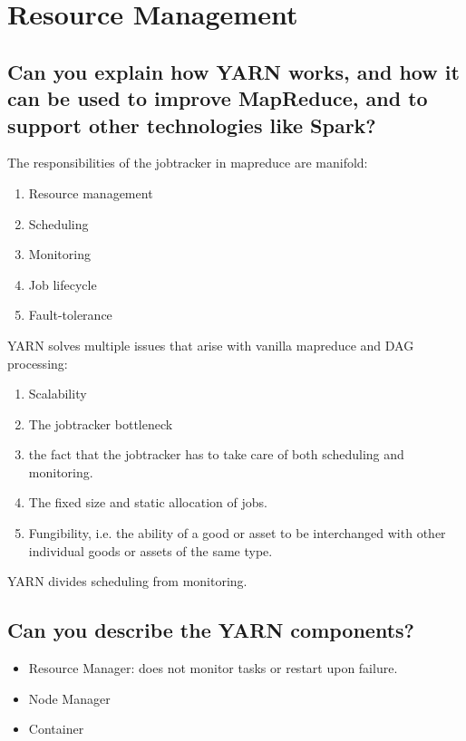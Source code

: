 \documentclass{article}
\begin{document}
\pagebreak

\section{Resource Management}



\subsection{Can you explain how YARN works, and how it can be used to improve MapReduce, and to support other technologies like Spark?}

The responsibilities of the jobtracker in mapreduce are manifold:

\begin{enumerate}
\item Resource management
\item Scheduling
\item Monitoring
\item Job lifecycle
\item Fault-tolerance
\end{enumerate}


YARN solves multiple issues that arise with vanilla mapreduce and DAG processing:
\begin{enumerate}
\item Scalability
\item The jobtracker bottleneck
\item the fact that the jobtracker has to take care of both scheduling and monitoring.
\item The fixed size and static allocation of jobs.
\item Fungibility, i.e. the ability of a good or asset to be interchanged with other individual goods or assets of the same type.
\end{enumerate}

YARN divides scheduling from monitoring.

\subsection{Can you describe the YARN components?}

\begin{itemize}
\item Resource Manager: does not monitor tasks or restart upon failure.
\item Node Manager
\item Container
\end{itemize}
\end{document}

